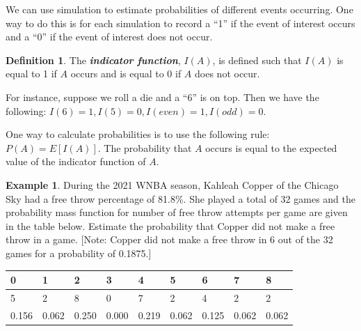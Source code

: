 \documentclass[
  11pt,
]{book}
\theoremstyle{definition}
\newtheorem{definition}{Definition}[chapter]
\theoremstyle{definition}
\newtheorem{example}{Example}[chapter]
\theoremstyle{definition}
\theoremstyle{definition}
\theoremstyle{remark}
\begin{document}
We can use simulation to estimate probabilities of different events occurring. One way to do this is for each simulation to record a ``1'' if the event of interest occurs and a ``0'' if the event of interest does not occur.

\begin{definition}
The \textbf{\emph{indicator function}}, \(I(A)\), is defined such that \(I(A)\) is equal to 1 if \(A\) occurs and is equal to 0 if \(A\) does not occur.
\end{definition}

For instance, suppose we roll a die and a ``6'' is on top. Then we have the following: \(I(6)=1, I(5)=0, I(even)=1, I(odd)=0\).

One way to calculate probabilities is to use the following rule: \(P(A) = E[I(A)]\). The probability that \(A\) occurs is equal to the expected value of the indicator function of \(A\).

\begin{example}
During the 2021 WNBA season, Kahleah Copper of the Chicago Sky had a free throw percentage of 81.8\%. She played a total of 32 games and the probability mass function for number of free throw attempts per game are given in the table below. Estimate the probability that Copper did not make a free throw in a game. {[}Note: Copper did not make a free throw in 6 out of the 32 games for a probability of 0.1875.{]}
\end{example}

\begin{table}
\centering
\begin{tabular}{l|l|l|l|l|l|l|l|l}
\hline
0 & 1 & 2 & 3 & 4 & 5 & 6 & 7 & 8\\
\hline
5 & 2 & 8 & 0 & 7 & 2 & 4 & 2 & 2\\
\hline
0.156 & 0.062 & 0.250 & 0.000 & 0.219 & 0.062 & 0.125 & 0.062 & 0.062\\
\hline
\end{tabular}
\end{table}
\end{document}
